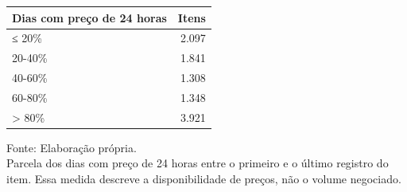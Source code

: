 \begingroup
\setlength{}
\setlength{}
\fontsize{12.0pt}{14.4pt}\selectfont

\setlength{\LTpost}{0mm}
\begin{longtable}{@{\extracolsep{\fill}}lr}

\toprule
\textbf{Dias com preço de 24 horas} & \textbf{Itens} \\ 
\midrule\addlinespace[2.5pt]
≤ 20\% & 2.097 \\
20-40\% & 1.841 \\
40-60\% & 1.308 \\
60-80\% & 1.348 \\
\textgreater{} 80\% & 3.921 \\
\bottomrule
\end{longtable}
\begin{minipage}{\linewidth}
Fonte: Elaboração própria.\\
Parcela dos dias com preço de 24 horas entre o primeiro e o último registro do item. Essa medida descreve a disponibilidade de preços, não o volume negociado.\\
\end{minipage}
\endgroup
